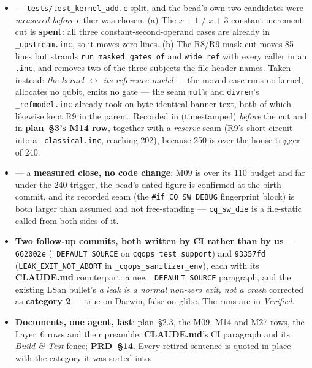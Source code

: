\begin{itemize}[leftmargin=1.5em,itemsep=4pt,topsep=4pt,parsep=0pt]
      \texttt{PYTHONDONTWRITEBYTECODE} --- only the shim suites do.
\item {} --- \texttt{tests/test\_kernel\_add.c} split, and the bead's own
      two candidates were \emph{measured before} either was chosen. (a) The
      $x{+}1$ / $x{+}3$ constant-increment cut is \textbf{spent}: all three
      constant-second-operand cases are already in \texttt{\_upstream.inc}, so it
      moves zero lines. (b) The R8/R9 mask cut moves 85 lines but strands
      \texttt{run\_masked}, \texttt{gates\_of} and \texttt{wide\_ref} with every
      caller in an \texttt{.inc}, and removes two of the three subjects the file
      header names. Taken instead: \emph{the kernel $\leftrightarrow$ its
      reference model} --- the moved case runs no kernel, allocates no qubit,
      emits no gate --- the seam \texttt{mul}'s and \texttt{divrem}'s
      \texttt{\_refmodel.inc} already took on byte-identical banner text, both of
      which likewise kept R9 in the parent. Recorded in  (timestamped)
      \emph{before} the cut and in \textbf{plan~§3's M14 row}, together with a
      \emph{reserve} seam (R9's short-circuit into a \texttt{\_classical.inc},
      reaching 202), because 250 is over the house trigger of 240.
\item {} --- a \textbf{measured close, no code change}: M09 is over its
      110 budget and far under the 240 trigger, the bead's dated figure is
      confirmed at the birth commit, and its recorded seam (the
      \texttt{\#if CQ\_SW\_DEBUG} fingerprint block) is both larger than assumed
      and not free-standing --- \texttt{cq\_sw\_die} is a file-static called from
      both sides of it.
\item \textbf{Two follow-up commits, both written by CI rather than by us} ---
      \texttt{662002e} (\texttt{\_DEFAULT\_SOURCE} on
      \texttt{cqops\_test\_support}) and \texttt{93357fd}
      (\texttt{LEAK\_EXIT\_NOT\_ABORT} in \texttt{\_cqops\_sanitizer\_env}), each
      with its \textbf{CLAUDE.md} counterpart: a new \texttt{\_DEFAULT\_SOURCE}
      paragraph, and the existing LSan bullet's \emph{a leak is a normal non-zero
      exit, not a crash} corrected as  \textbf{category 2} --- true on
      Darwin, false on glibc. The runs are in \emph{Verified}.
\item \textbf{Documents, one agent, last}: plan~§2.3, the M09, M14 and M27 rows,
      the Layer~6 rows and their preamble; \textbf{CLAUDE.md}'s CI paragraph and
      its \emph{Build \& Test} fence; \textbf{PRD~§14}. Every retired sentence is
      quoted in place with the  category it was sorted into.
\end{itemize}

